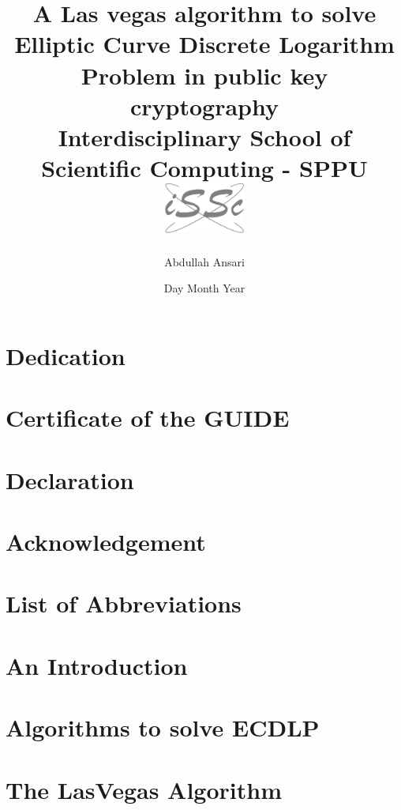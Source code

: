 \documentclass[12pt,twoside]{report}
\title{
    {A Las vegas algorithm to solve Elliptic Curve Discrete Logarithm Problem in public key cryptography}\\
    {\large Interdisciplinary School of Scientific Computing - SPPU}\\
    \includegraphics[width=0.2\textwidth]{issc.jpg}
}
\author{Abdullah Ansari}
\date{Day Month Year}
\begin{document}
\maketitle

\chapter*{Dedication}


\chapter*{Certificate of the GUIDE}


\chapter*{Declaration}


\chapter*{Acknowledgement}



\tableofcontents

\listoffigures
{}

\listoftables

\chapter*{List of Abbreviations}

\chapter{An Introduction }


\chapter[ECDLP]{Algorithms to solve ECDLP }


\chapter{The LasVegas Algorithm }

\end{document}
